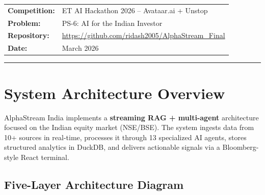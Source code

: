\documentclass[11pt, a4paper]{article}
\begin{document}
\begin{titlepage}
  \begin{tabular}{ll}
    \textbf{\color{navy}Competition:}  & ET AI Hackathon 2026 -- Avataar.ai + Unstop \\[3pt]
    \textbf{\color{navy}Problem:}      & PS-6: AI for the Indian Investor \\[3pt]
    \textbf{\color{navy}Repository:}   & \url{https://github.com/ridash2005/AlphaStream_Final} \\[3pt]
    \textbf{\color{navy}Date:}         & March 2026 \\
  \end{tabular}

  \vfill
  {\color{cyan}\rule{\linewidth}{1.5pt}}
\end{titlepage}


\section{System Architecture Overview}

AlphaStream India implements a \textbf{streaming RAG + multi-agent} architecture focused
on the Indian equity market (NSE/BSE). The system ingests data from 10+ sources in
real-time, processes it through 13 specialized AI agents, stores structured analytics
in DuckDB, and delivers actionable signals via a Bloomberg-style React terminal.

\subsection{Five-Layer Architecture Diagram}
\end{document}
